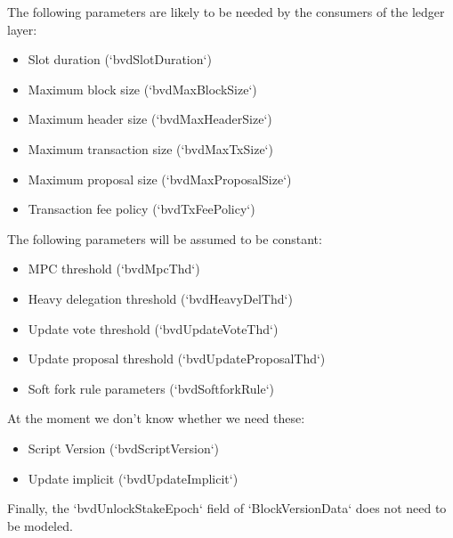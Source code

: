 The following parameters are likely to be needed by the consumers of the ledger
layer:

\begin{itemize}
\item Slot duration (`bvdSlotDuration`)
\item Maximum block size (`bvdMaxBlockSize`)
\item Maximum header size (`bvdMaxHeaderSize`)
\item Maximum transaction size (`bvdMaxTxSize`)
\item Maximum proposal size (`bvdMaxProposalSize`)
\item Transaction fee policy (`bvdTxFeePolicy`)
\end{itemize}

The following parameters will be assumed to be constant:
\begin{itemize}
\item MPC threshold (`bvdMpcThd`)
\item Heavy delegation threshold (`bvdHeavyDelThd`)
\item Update vote threshold (`bvdUpdateVoteThd`)
\item Update proposal threshold (`bvdUpdateProposalThd`)
\item Soft fork rule parameters (`bvdSoftforkRule`)
\end{itemize}

At the moment we don't know whether we need these:

\begin{itemize}
\item Script Version (`bvdScriptVersion`)
\item Update implicit (`bvdUpdateImplicit`)
\end{itemize}

Finally, the `bvdUnlockStakeEpoch` field of `BlockVersionData` does not need to
be modeled.

